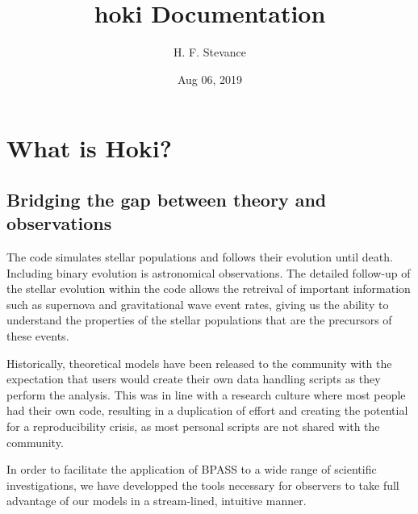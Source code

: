 \documentclass[letterpaper,10pt,english]{sphinxmanual}
\title{hoki Documentation}
\date{Aug 06, 2019}
\author{H. F. Stevance}
\begin{document}
\maketitle
\sphinxtableofcontents
{}\label{\detokenize{index::doc}}



\chapter{What is Hoki?}
\label{\detokenize{intro:welcome-to-hoki}}\label{\detokenize{intro::doc}}\label{\detokenize{intro:what-is-hoki}}

\section{Bridging the gap between theory and observations}
\label{\detokenize{intro:bridging-the-gap-between-theory-and-observations}}
\begin{sphinxShadowBox}

The  code simulates stellar populations and follows their evolution until death. Including binary evolution is  astronomical observations. The detailed follow-up of the stellar evolution within the code allows the retreival of important information such as supernova and gravitational wave event rates, giving us the ability to understand the properties of the stellar populations that are the precursors of these events.
\end{sphinxShadowBox}

Historically, theoretical models have been released to the community with the expectation that users would create their own data handling scripts as they perform the analysis. This was in line with a research culture where most people had their own code, resulting in a duplication of effort and creating the potential for a reproducibility crisis, as most personal scripts are not shared with the community.

In order to facilitate the application of BPASS to a wide range of scientific investigations, we have developped the tools necessary for observers to take full advantage of our models in a stream-lined, intuitive manner.
\begin{quote}

\begin{DUlineblock}{0em}
\item[] 
\end{DUlineblock}
\end{quote}
\end{document}
